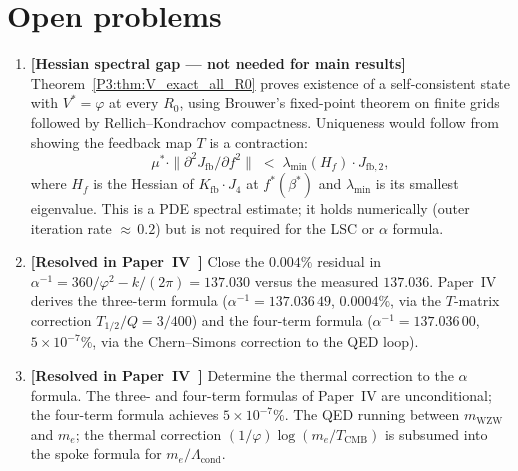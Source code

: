 \documentclass[11pt,a4paper]{article}
\theoremstyle{definition}
\theoremstyle{remark}
\newcommand{\vp}{\varphi}
\newcommand{\aInv}{\alpha^{-1}}
\begin{document}
\section{Open problems}
\label{P3:sec:open}

\begin{enumerate}[noitemsep]
  \item \textbf{[Hessian spectral gap --- not needed for main results]}
    Theorem~\ref{P3:thm:V_exact_all_R0} proves existence of a self-consistent
    state with $V^*=\vp$ at every $R_0$, using Brouwer's fixed-point theorem
    on finite grids followed by Rellich--Kondrachov compactness.
    Uniqueness would follow from showing the feedback map $T$ is a contraction:
    \begin{equation*}
      \mu^* \cdot \|\partial^2 J_{\mathrm{fb}}/\partial f^2\|
      \;<\; \lambda_{\min}(H_f) \cdot J_{\mathrm{fb},2},
    \end{equation*}
    where $H_f$ is the Hessian of $K_{\mathrm{fb}}\cdot J_4$ at $f^*(\beta^*)$
    and $\lambda_{\min}$ is its smallest eigenvalue.
    This is a PDE spectral estimate; it holds numerically (outer iteration
    rate ${\approx}\,0.2$) but is not required for the LSC or $\alpha$ formula.

  \item \textbf{[Resolved in Paper~IV~\cite{Paper4}]}
    Close the $0.004\%$ residual in $\aInv = 360/\vp^2 - k/(2\pi) = 137.030$
    versus the measured $137.036$.
    Paper~IV derives the three-term formula ($\aInv=137.036\,49$, $0.0004\%$,
    via the $T$-matrix correction $T_{1/2}/Q = 3/400$)
    and the four-term formula ($\aInv=137.036\,00$, $5\times10^{-7}\%$,
    via the Chern--Simons correction to the QED loop).

  \item \textbf{[Resolved in Paper~IV~\cite{Paper4}]}
    Determine the thermal correction to the $\alpha$ formula.
    The three- and four-term formulas of Paper~IV are unconditional;
    the four-term formula achieves $5\times10^{-7}\%$. The QED running between $m_{\mathrm{WZW}}$ and $m_e$;
    the thermal correction $(1/\vp)\log(m_e/T_{\mathrm{CMB}})$ is
    subsumed into the spoke formula for $m_e/\Lambda_{\mathrm{cond}}$.


\end{enumerate}
\end{document}
